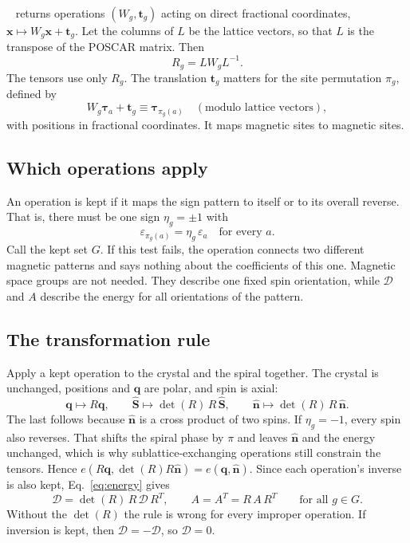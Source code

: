 \documentclass[11pt,a4paper]{article}
\numberwithin{equation}{section}
\newcommand{\vct}[1]{\bm{#1}}
\newcommand{\nh}{\hat{\vct n}}
\newcommand{\qh}{\vct q}
\newcommand{\Dt}{\mathcal D}
\newcommand{\code}[1]{\texttt{\detokenize{#1}}}
\begin{document}
\code{spglib}~\cite{spglib} returns operations $(W_g,\vct t_g)$ acting on direct
fractional coordinates, $\vct x\mapsto W_g\vct x+\vct t_g$. Let the columns of $L$ be the
lattice vectors, so that $L$ is the transpose of the POSCAR matrix. Then
\begin{equation}\label{eq:cart}
 \boxed{R_g=LW_gL^{-1}.}
\end{equation}
The tensors use only $R_g$. The translation $\vct t_g$ matters for the site
permutation $\pi_g$, defined by
\begin{equation}\label{eq:perm}
 W_g\vct\tau_{a}+\vct t_g\equiv\vct\tau_{\pi_g(a)}
 \quad(\text{modulo lattice vectors}),
\end{equation}
with positions in fractional coordinates. It maps magnetic sites to magnetic sites.

\subsection{Which operations apply}

An operation is kept if it maps the sign pattern to itself or to its overall
reverse. That is, there must be one sign $\eta_g=\pm1$ with
\begin{equation}\label{eq:keep}
 \boxed{\varepsilon_{\pi_g(a)}=\eta_g\,\varepsilon_a\quad\text{for every }a.}
\end{equation}
Call the kept set $G$. If this test fails, the operation connects two different
magnetic patterns and says nothing about the coefficients of this one.
Magnetic space groups are not needed. They describe one fixed spin orientation,
while $\Dt$ and $A$ describe the energy for all orientations of the pattern.

\subsection{The transformation rule}

Apply a kept operation to the crystal and the spiral together. The crystal is
unchanged, positions and $\qh$ are polar, and spin is axial:
\begin{equation}\label{eq:maps}
 \qh\mapsto R\qh,\qquad
 \hat{\vct S}\mapsto\det(R)\,R\,\hat{\vct S},\qquad
 \nh\mapsto\det(R)\,R\,\nh.
\end{equation}
The last follows because $\nh$ is a cross product of two spins. If $\eta_g=-1$,
every spin also reverses. That shifts the spiral phase by $\pi$ and leaves $\nh$
and the energy unchanged, which is why sublattice-exchanging operations still
constrain the tensors. Hence $e(R\qh,\det(R)R\nh)=e(\qh,\nh)$. Since each
operation's inverse is also kept, Eq.~\eqref{eq:energy} gives
\begin{equation}\label{eq:rules}
 \boxed{\Dt=\det(R)\,R\,\Dt\,R^{T},\qquad A=A^T=R\,A\,R^{T}\qquad\text{for all }g\in G.}
\end{equation}
Without the $\det(R)$ the rule is wrong for every improper operation. If
inversion is kept, then $\Dt=-\Dt$, so $\Dt=0$.
\end{document}
